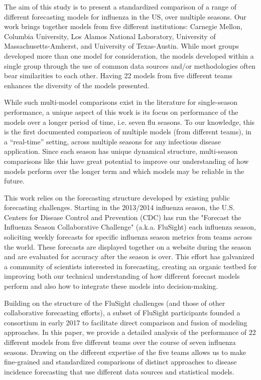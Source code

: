 \documentclass{article}\usepackage[]{graphicx}\usepackage[]{color}
\begin{document}
The aim of this study is to present a standardized comparison of a range of different forecasting models for influenza in the US, over multiple seasons.
Our work brings together models from five different institutions: Carnegie Mellon, Columbia University, Los Alamos National Laboratory, University of Massachusetts-Amherst, and University of Texas-Austin.
While most groups developed more than one model for consideration, the models developed within a single group through the use of common data sources and/or methodologies often bear similarities to each other.
Having 22 models from five different teams enhances the diversity of the models presented.

While such multi-model comparisons exist in the literature for single-season performance, a unique aspect of this work is its focus on performance of the models over a longer period of time, i.e. seven flu seasons. 
To our knowledge, this is the first documented comparison of multiple models (from different teams), in a ``real-time'' setting, across multiple seasons for any infectious disease application.
Since each season has unique dynamical structure, multi-season comparisons like this have great potential to improve our understanding of how models perform over the longer term and which models may be reliable in the future.

This work relies on the forecasting structure developed by existing public forecasting challenges.
Starting in the 2013/2014 influenza season, the U.S. Centers for Disease Control and Prevention (CDC) has run the "Forecast the Influenza Season Collaborative Challenge" (a.k.a. FluSight) each influenza season, soliciting weekly forecasts for specific influenza season metrics from teams across the world.\cite{Biggerstaff2016,Biggerstaff2018}
These forecasts are displayed together on a website during the season and are evaluated for accuracy after the season is over.\cite{PhiResearchLab} 
This effort has galvanized a community of scientists interested in forecasting, creating an organic testbed for improving both our technical understanding of how different forecast models perform and also how to integrate these models into decision-making.


Building on the structure of the FluSight challenges (and those of other collaborative forecasting efforts\cite{Smith2017,Viboud2017}), a subset of FluSight participants founded a consortium in early 2017 to facilitate direct comparison and fusion of modeling approaches. 
In this paper, we provide a detailed analysis of the performance of 22 different models from five different teams over the course of seven influenza seasons.
Drawing on the different expertise of the five teams allows us to make fine-grained and standardized comparisons of distinct approaches to disease incidence forecasting that use different data sources and statistical models.
\end{document}
